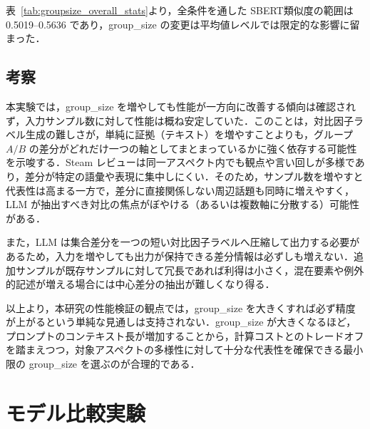 表~\ref{tab:groupsize_overall_stats}より，全条件を通した SBERT類似度の範囲は 0.5019--0.5636 であり，group\_size の変更は平均値レベルでは限定的な影響に留まった．

\subsection{考察}
本実験では，group\_size を増やしても性能が一方向に改善する傾向は確認されず，入力サンプル数に対して性能は概ね安定していた．このことは，対比因子ラベル生成の難しさが，単純に証拠（テキスト）を増やすことよりも，グループ $A/B$ の差分がどれだけ一つの軸としてまとまっているかに強く依存する可能性を示唆する．Steam レビューは同一アスペクト内でも観点や言い回しが多様であり，差分が特定の語彙や表現に集中しにくい．そのため，サンプル数を増やすと代表性は高まる一方で，差分に直接関係しない周辺話題も同時に増えやすく，LLM が抽出すべき対比の焦点がぼやける（あるいは複数軸に分散する）可能性がある．

また，LLM は集合差分を一つの短い対比因子ラベルへ圧縮して出力する必要があるため，入力を増やしても出力が保持できる差分情報は必ずしも増えない．追加サンプルが既存サンプルに対して冗長であれば利得は小さく，混在要素や例外的記述が増える場合には中心差分の抽出が難しくなり得る．

以上より，本研究の性能検証の観点では，group\_size を大きくすれば必ず精度が上がるという単純な見通しは支持されない．group\_size が大きくなるほど，プロンプトのコンテキスト長が増加することから，計算コストとのトレードオフを踏まえつつ，対象アスペクトの多様性に対して十分な代表性を確保できる最小限の group\_size を選ぶのが合理的である．

\section{モデル比較実験}
